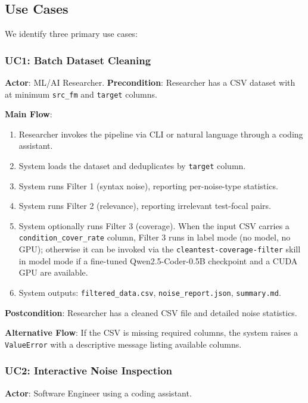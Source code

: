 \documentclass[acmlarge,nonacm,screen]{acmart}
\begin{document}
\subsection{Use Cases}

We identify three primary use cases:

\subsubsection{UC1: Batch Dataset Cleaning}

\textbf{Actor}: ML/AI Researcher.
\textbf{Precondition}: Researcher has a CSV dataset with at minimum \texttt{src\_fm} and \texttt{target} columns.

\textbf{Main Flow}:
\begin{enumerate}
    \item Researcher invokes the pipeline via CLI or natural language through a coding assistant.
    \item System loads the dataset and deduplicates by \texttt{target} column.
    \item System runs Filter 1 (syntax noise), reporting per-noise-type statistics.
    \item System runs Filter 2 (relevance), reporting irrelevant test-focal pairs.
    \item System optionally runs Filter 3 (coverage). When the input CSV carries a \texttt{condition\_cover\_rate} column, Filter 3 runs in label mode (no model, no GPU); otherwise it can be invoked via the \texttt{cleantest-coverage-filter} skill in model mode if a fine-tuned Qwen2.5-Coder-0.5B checkpoint and a CUDA GPU are available.
    \item System outputs: \texttt{filtered\_data.csv}, \texttt{noise\_report.json}, \texttt{summary.md}.
\end{enumerate}

\textbf{Postcondition}: Researcher has a cleaned CSV file and detailed noise statistics.

\textbf{Alternative Flow}: If the CSV is missing required columns, the system raises a \texttt{ValueError} with a descriptive message listing available columns.

\subsubsection{UC2: Interactive Noise Inspection}

\textbf{Actor}: Software Engineer using a coding assistant.
\end{document}
